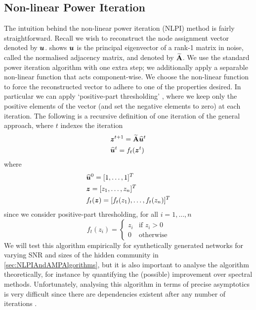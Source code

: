 \subsection{Non-linear Power Iteration}
\label{subsec:nonLinearPowerIteration}

The intuition behind the non-linear power iteration (NLPI) method is fairly straightforward.
Recall we wish to reconstruct the node assignment vector denoted by $\vecvar{u}$.  shows $\vecvar{u}$ is the principal eigenvector of a rank-1 matrix in noise, called the normalised adjacency matrix, and denoted by $\widetilde{\mathbf A}$.
We use the standard power iteration algorithm with one extra step; we additionally apply a separable non-linear function that acts component-wise.
We choose the non-linear function to force the reconstructed vector to adhere to one of the properties desired. In particular we can apply `positive-part thresholding' \cite{Mon13}, where we keep only the positive elements of the vector (and set the negative elements to zero) at each iteration.
The following is a recursive definition of one iteration of the general approach, where $t$ indexes the iteration
\begin{equation}
	\label{eq:NLPIAlgorithm}
	\begin{split}
		&\vecvar{z}^{t+1} = \widetilde{\matvar{A}} \widehat{\vecvar{u}}^{t} \\
		&\widehat{\vecvar{u}}^{t} = f_{t}(\vecvar{z}^{t})
	\end{split}
\end{equation}
where
\begin{equation}
	\label{eq:NLPIAlgorithmConditions}
	\begin{split}
		&\widehat{\vecvar{u}}^{0} = \transpose{[1,\dots,1]} \\
		&\vecvar{z} = \transpose{[z_{1},\dots,z_{n}]} \\
		&f_{t}(\vecvar{z}) = \transpose{[f_{t}(z_{1}),\dots,f_{t}(z_{n})]}
	\end{split}
\end{equation}
since we consider positive-part thresholding, for all $i=1,\dots,n$
\begin{equation}
	\label{eq:NLPIAlgorithmThresholding}
	f_{t}(z_{i}) =
	\begin{cases}
		z_{i}& \text{if } z_{i} > 0\\
		0 & \text{otherwise}
	\end{cases}
\end{equation}
We will test this algorithm empirically for synthetically generated networks for varying SNR and sizes of the hidden community in \cref{sec:NLPIAndAMPAlgorithms}, but it is also important to analyse the algorithm theoretically, for instance by quantifying the (possible) improvement over spectral methods.
Unfortunately, analysing this algorithm in terms of precise asymptotics is very difficult since there are dependencies existent after any number of iterations \cite{Mon13}.

